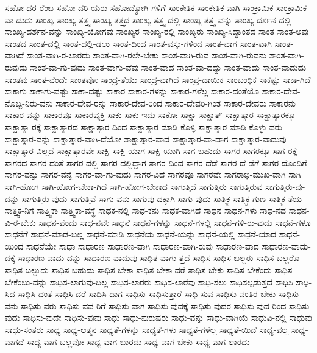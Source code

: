 {ಸಹೋ-ದರ-ರೆಂಬ
ಸಹೋ-ದರಿ-ಯರು
ಸಹೋದ್ಯೋಗಿ-ಗಳಿಗೆ
ಸಾಂಕೇತಿಕ
ಸಾಂಕೇತಿಕ-ವಾಗಿ
ಸಾಂಕ್ರಾಮಿಕ
ಸಾಂಕ್ರಾಮಿಕ-ವಾ-ದುದು
ಸಾಂಖ್ಯ
ಸಾಂಖ್ಯ-ತತ್ತ್ವ
ಸಾಂಖ್ಯ-ತತ್ತ್ವದ
ಸಾಂಖ್ಯ-ತತ್ತ್ವ-ದಲ್ಲಿ
ಸಾಂಖ್ಯ-ತತ್ತ್ವ-ವನ್ನು
ಸಾಂಖ್ಯ-ದರ್ಶನ-ದಲ್ಲಿ
ಸಾಂಖ್ಯ-ದರ್ಶನ-ವನ್ನು
ಸಾಂಖ್ಯ-ಯೋಗವು
ಸಾಂಖ್ಯರ
ಸಾಂಖ್ಯ-ರಲ್ಲಿ
ಸಾಂಖ್ಯರು
ಸಾಂಖ್ಯ-ಸಿದ್ಧಾಂತದ
ಸಾಂತ
ಸಾಂತ-ಅವು
ಸಾಂತದ
ಸಾಂತ-ದಲ್ಲಿ
ಸಾಂತ-ದಲ್ಲಿ-ಡಲು
ಸಾಂತ-ದಿಂದ
ಸಾಂತ-ವಸ್ತು-ಗಳಿಂದ
ಸಾಂತ-ವಾಗ
ಸಾಂತ-ವಾಗಿ
ಸಾಂತ-ವಾಗಿದೆ
ಸಾಂತ-ವಾಗಿ-ರ-ಲಾರದು
ಸಾಂತ-ವಾಗಿ-ರಲೇ-ಬೇಕು
ಸಾಂತ-ವಾಗಿ-ರುವ
ಸಾಂತ-ವಾಗಿ-ರುವನು
ಸಾಂತ-ವಾಗಿ-ರುವುದು
ಸಾಂತ-ವಾ-ಗು-ವುದು
ಸಾಂತ-ವಾಗು-ವೆವು
ಸಾಂತ-ವಾದ
ಸಾಂತ-ವಾ-ದದ್ದು
ಸಾಂತ-ವಾದು
ಸಾಂತ-ವಾದುದು
ಸಾಂತವು
ಸಾಂತ-ವೆಂದೇ
ಸಾಂತವೋ
ಸಾಂದ್ರ-ತೆಯು
ಸಾಂದ್ರ-ವಾಗಿದೆ
ಸಾಂಪ್ರ-ದಾಯಿಕ
ಸಾಂಬಂಧಿಕ
ಸಾಕಷ್ಟು
ಸಾಕಾ-ಗಿದೆ
ಸಾಕಾಗು
ಸಾಕಾಗು-ವಷ್ಟು
ಸಾಕಾ-ದಷ್ಟು
ಸಾಕಾರ
ಸಾಕಾರ-ಗಳನ್ನು
ಸಾಕಾರ-ಗಳೆಲ್ಲ
ಸಾಕಾರ-ದಂತೆಯೊ
ಸಾಕಾರ-ದೇವ-ನೊಬ್ಬ-ನಿರು-ವನು
ಸಾಕಾರ-ದೇವ-ರನ್ನು
ಸಾಕಾರ-ದೇವ-ರಿಂದ
ಸಾಕಾರ-ದೇವರಿ-ಗಿಂತ
ಸಾಕಾರ-ದೇವರು
ಸಾಕಾರನು
ಸಾಕಾರ-ವನ್ನು
ಸಾಕಾರವೂ
ಸಾಕಾರವ್ಯಕ್ತಿ
ಸಾಕು
ಸಾಕು-ಇದು
ಸಾಕೋ
ಸಾಕ್ಷಾ
ಸಾಕ್ಷಾತ್
ಸಾಕ್ಷಾತ್ಕಾರ
ಸಾಕ್ಷಾತ್ಕಾರಕ್ಕೂ
ಸಾಕ್ಷಾತ್ಕಾ-ರಕ್ಕೆ
ಸಾಕ್ಷಾತ್ಕಾರದ
ಸಾಕ್ಷಾತ್ಕಾರ-ದಿಂದ
ಸಾಕ್ಷಾತ್ಕಾರ-ಮಾಡಿ-ಕೊಳ್ಳಿ
ಸಾಕ್ಷಾತ್ಕಾರ-ಮಾಡಿ-ಕೊಳ್ಳು-ವರು
ಸಾಕ್ಷಾತ್ಕಾರ-ವನ್ನು
ಸಾಕ್ಷಾತ್ಕಾರ-ವಾಗಿ-ದೆಯೋ
ಸಾಕ್ಷಾತ್ಕಾರ-ವಾದ
ಸಾಕ್ಷಾತ್ಕಾರ-ವಾ-ದಾಗ
ಸಾಕ್ಷಾತ್ಕಾರ-ವಾದುವು
ಸಾಕ್ಷಾತ್ಕಾರ-ವಿಲ್ಲದೆ
ಸಾಕ್ಷಾತ್ಕಾರವೇ
ಸಾಕ್ಷಿ
ಸಾಕ್ಷಿ-ಯಾಗ
ಸಾಕ್ಷಿ-ಯಾಗಿ
ಸಾಗ-ಬಹುದು
ಸಾಗರ
ಸಾಗರಕ್ಕೂ
ಸಾಗ-ರಕ್ಕೆ
ಸಾಗರದ
ಸಾಗರ-ದಂತೆ
ಸಾಗರ-ದಲ್ಲಿ
ಸಾಗರ-ದಲ್ಲಿದ್ದಾಗ
ಸಾಗರ-ದಿಂದ
ಸಾಗರ-ದೆಡೆ
ಸಾಗರ-ದೆ-ಡೆಗೆ
ಸಾಗರ-ದೊಂದಿಗೆ
ಸಾಗರ-ವನ್ನು
ಸಾಗರ-ವನ್ನೆ
ಸಾಗರ-ವಾ-ಗು-ವುದು
ಸಾಗರ-ವಿದೆ
ಸಾಗರವೂ
ಸಾಗರವೇ
ಸಾಗರಾಭಿ-ಮುಖ-ವಾಗಿ
ಸಾಗಿ
ಸಾಗಿ-ಹೋಗ
ಸಾಗಿ-ಹೋಗ-ಬೇಕಾ-ಗಿದೆ
ಸಾಗಿ-ಹೋಗ-ಬೇಕಾದ
ಸಾಗುತ್ತಿದೆ
ಸಾಗುತ್ತಿರು
ಸಾಗುತ್ತಿರುವ
ಸಾಗುತ್ತಿರು-ವು-ದನ್ನು
ಸಾಗುತ್ತಿರು-ವುದು
ಸಾಗುತ್ತಿವೆ
ಸಾಗು-ವನು
ಸಾಗುವು-ದಕ್ಕಾಗಿ
ಸಾಗು-ವುದು
ಸಾತ್ತ್ವಿಕ
ಸಾತ್ತ್ವಿಕ-ಗುಣ
ಸಾತ್ತ್ವಿಕ-ತೆಯ
ಸಾತ್ತ್ವಿಕ-ನಿಗೆ
ಸಾತ್ತ್ವಿಕಾ
ಸಾತ್ತ್ವಿಕಾ-ವಸ್ಥೆ
ಸಾಧಕ-ನಲ್ಲಿ
ಸಾಧ-ಕನು
ಸಾಧಕ-ವಾಗಿದೆ
ಸಾಧನ
ಸಾಧನ-ಗಳು
ಸಾಧ-ನದ
ಸಾಧನ-ವಿ-ರ-ಬೇಕು
ಸಾಧನ-ವೆಂದು
ಸಾಧ-ನವೇ
ಸಾಧನೆ
ಸಾಧನೆ-ಗಳನ್ನು
ಸಾಧನೆ-ಗಳಲ್ಲಿ
ಸಾಧನೆ-ಗಳಿ-ರು-ವುದು
ಸಾಧನೆ-ಗಳೂ
ಸಾಧನೆಗೆ
ಸಾಧನೆ-ಮಾಡ-ಬಲ್ಲ
ಸಾಧನೆ-ಮಾಡಿ
ಸಾಧನೆಯ
ಸಾಧನೆ-ಯನ್ನು
ಸಾಧನೆ-ಯಲ್ಲಿ
ಸಾಧನೆ-ಯಾದ
ಸಾಧನೆ-ಯಿಂದ
ಸಾಧನೆಯೇ
ಸಾಧಾ
ಸಾಧಾರಣ
ಸಾಧಾರಣ-ವಾಗಿ
ಸಾಧಾರಣ-ವಾಗಿ-ರುವು
ಸಾಧಾರಣ-ವಾದ
ಸಾಧಾರಣ-ವಾದು-ದಕ್ಕೆ
ಸಾಧಾರಣ-ವಾದು-ದನ್ನು
ಸಾಧಾರಣ-ವಾದುವು
ಸಾಧಿತ-ವಾಗು-ತ್ತದೆ
ಸಾಧಿಸ
ಸಾಧಿಸ-ಬಲ್ಲರು
ಸಾಧಿಸ-ಬಲ್ಲರೊ
ಸಾಧಿಸ-ಬಲ್ಲುದು
ಸಾಧಿಸ-ಬಹುದು
ಸಾಧಿಸ-ಬೇಕಾ
ಸಾಧಿಸ-ಬೇಕಾ-ದರೆ
ಸಾಧಿಸ-ಬೇಕು
ಸಾಧಿಸ-ಬೇಕೆಂದು
ಸಾಧಿಸ-ಬೇಕೆಂಬು-ದನ್ನು
ಸಾಧಿಸ-ಲಾಗುವು-ದಿಲ್ಲ
ಸಾಧಿಸ-ಲಾರರು
ಸಾಧಿಸ-ಲಾರೆವು
ಸಾಧಿ-ಸಲು
ಸಾಧಿಸಲ್ಪಡುತ್ತದೆ
ಸಾಧಿಸಿ
ಸಾಧಿ-ಸಿದ
ಸಾಧಿಸಿ-ದಂತೆ
ಸಾಧಿಸಿ-ದರೆ
ಸಾಧಿಸಿ-ದಾಗ
ಸಾಧಿಸು
ಸಾಧಿಸುತ್ತಾರೆ
ಸಾಧಿ-ಸುವ
ಸಾಧಿಸು-ವಂತಿರ-ಬೇಕು
ಸಾಧಿಸು-ವನು
ಸಾಧಿಸು-ವರು
ಸಾಧಿಸು-ವವ-ರಿಗೆ
ಸಾಧಿಸು-ವಾಗ
ಸಾಧಿಸು-ವುದಕ್ಕೆ
ಸಾಧಿಸು-ವುದರ
ಸಾಧಿಸು-ವುದ-ರಿಂದ
ಸಾಧಿಸು-ವುದು
ಸಾಧಿಸು-ವುದೇ
ಸಾಧಿಸು-ವುವು
ಸಾಧು
ಸಾಧು-ಪುರುಷರು
ಸಾಧು-ವನ್ನು
ಸಾಧು-ವಾಗಿಯೆ
ಸಾಧುವಿ-ನಲ್ಲಿ
ಸಾಧುವು
ಸಾಧು-ಸಂತರು
ಸಾಧ್ಯ
ಸಾಧ್ಯ-ಆತ್ಮನ
ಸಾಧ್ಯತೆ-ಗಳನ್ನು
ಸಾಧ್ಯತೆ-ಗಳು
ಸಾಧ್ಯತೆ-ಗಳೆಲ್ಲ
ಸಾಧ್ಯತೆ-ಯಿದೆ
ಸಾಧ್ಯ-ವಲ್ಲ
ಸಾಧ್ಯ-ವಾಗದೆ
ಸಾಧ್ಯ-ವಾಗ-ಬಲ್ಲವೋ
ಸಾಧ್ಯ-ವಾಗ-ಬಾರದು
ಸಾಧ್ಯ-ವಾಗ-ಬೇಕು
ಸಾಧ್ಯ-ವಾಗ-ಲಾರದು
}
